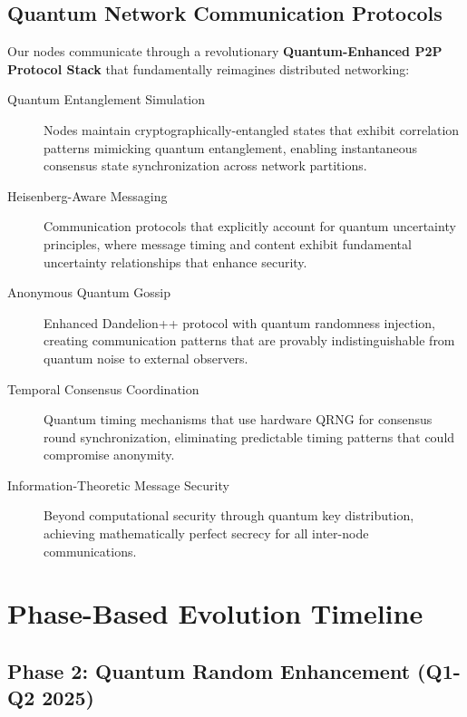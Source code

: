 \documentclass[11pt,a4paper]{article}
\begin{document}
\subsection{Quantum Network Communication Protocols}

Our nodes communicate through a revolutionary \textbf{Quantum-Enhanced P2P Protocol Stack} that fundamentally reimagines distributed networking:

\begin{description}
\item[Quantum Entanglement Simulation] Nodes maintain cryptographically-entangled states that exhibit correlation patterns mimicking quantum entanglement, enabling instantaneous consensus state synchronization across network partitions.

\item[Heisenberg-Aware Messaging] Communication protocols that explicitly account for quantum uncertainty principles, where message timing and content exhibit fundamental uncertainty relationships that enhance security.

\item[Anonymous Quantum Gossip] Enhanced Dandelion++ protocol with quantum randomness injection, creating communication patterns that are provably indistinguishable from quantum noise to external observers.

\item[Temporal Consensus Coordination] Quantum timing mechanisms that use hardware QRNG for consensus round synchronization, eliminating predictable timing patterns that could compromise anonymity.

\item[Information-Theoretic Message Security] Beyond computational security through quantum key distribution, achieving mathematically perfect secrecy for all inter-node communications.
\end{description}

\section{Phase-Based Evolution Timeline}

\subsection{Phase 2: Quantum Random Enhancement (Q1-Q2 2025)}
\end{document}
